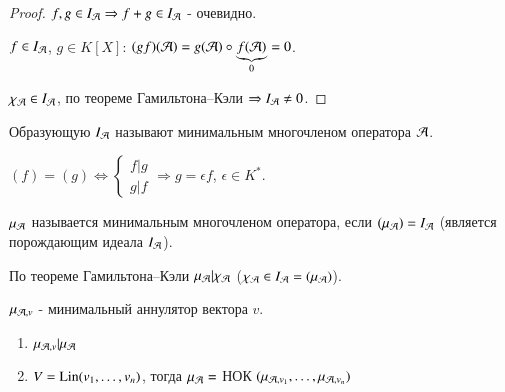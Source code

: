 \documentclass[main]{subfiles}
\begin{document}
\begin{proof}
    $f, g \in I_{\mathcal{A}} \Rightarrow f+g \in I_{\mathcal{A}}$ - очевидно.

    $f \in I_{\mathcal{A}}$, $g \in K[X]$: $(gf)(\mathcal{A}) = g(\mathcal{A}) \circ \underbrace{f(\mathcal{A})}_{0} = 0$.

    $\chi_{\mathcal{A}} \in I_{\mathcal{A}}$,  по теореме Гамильтона--Кэли $\Rightarrow I_{\mathcal{A}} \neq 0$.
\end{proof}

Образующую $I_{\mathcal{A}}$ называют минимальным многочленом  оператора $\mathcal{A}$.

\begin{remark}
    $(f) = (g) \Leftrightarrow \begin{cases}
            f|g \\
            g|f
        \end{cases} \Rightarrow g = \epsilon f$, $\epsilon \in K^*$.
\end{remark}

\begin{definition} 
    $\mu_{\mathcal{A}}$ называется минимальным многочленом оператора, если $(\mu_{\mathcal{A}}) = I_{\mathcal{A}}$ (является порождающим идеала $I_{\mathcal{A}}$).
\end{definition}

По теореме Гамильтона--Кэли $\mu_{\mathcal{A}}|\chi_{\mathcal{A}}$ ($\chi_{\mathcal{A}} \in I_{\mathcal{A}} = (\mu_{\mathcal{A}})$).

$\mu_{\mathcal{A}, v}$ - минимальный аннулятор вектора $v$.
\begin{proposition}
    \begin{enumerate}
        \item $\mu_{\mathcal{A}, v} | \mu_{\mathcal{A}}$
        \item $V = \operatorname{Lin}(v_1, \ldots, v_n)$, тогда $\mu_{\mathcal{A}} = $ НОК $(\mu_{\mathcal{A}, v_1}, \ldots, \mu_{\mathcal{A}, v_n})$
    \end{enumerate}
\end{proposition}
\end{document}
